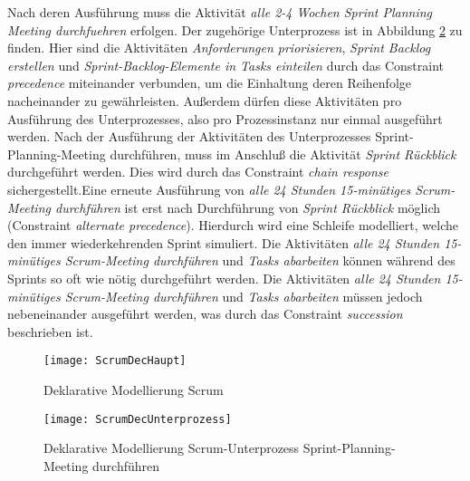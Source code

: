 Nach deren Ausführung muss die Aktivität \textit{alle 2-4 Wochen Sprint Planning Meeting durchfuehren} erfolgen. Der zugehörige Unterprozess ist in Abbildung \ref{fig:ScrumDecUnterprozess} zu finden. Hier sind die Aktivitäten \textit{Anforderungen priorisieren}, \textit{Sprint Backlog erstellen} und \textit{Sprint-Backlog-Elemente in Tasks einteilen} durch das Constraint \textit{precedence} miteinander verbunden, um die Einhaltung deren Reihenfolge nacheinander zu gewährleisten. Außerdem dürfen diese Aktivitäten pro Ausführung des Unterprozesses, also pro Prozessinstanz nur einmal ausgeführt werden.\newline
Nach der Ausführung der Aktivitäten des Unterprozesses Sprint-Planning-Meeting durchführen, muss im Anschluß die Aktivität \textit{Sprint Rückblick} durchgeführt werden. Dies wird durch das Constraint \textit{chain response} sichergestellt.Eine erneute Ausführung von  \textit{alle 24 Stunden 15-minütiges Scrum-Meeting durchführen} ist erst nach Durchführung von \textit{Sprint Rückblick} möglich (Constraint \textit{alternate precedence}). Hierdurch wird eine Schleife modelliert, welche den immer wiederkehrenden Sprint simuliert.\newline
Die Aktivitäten \textit{alle 24 Stunden 15-minütiges Scrum-Meeting durchführen} und \textit{Tasks abarbeiten} können während des Sprints so oft wie nötig durchgeführt werden. Die Aktivitäten  \textit{alle 24 Stunden 15-minütiges Scrum-Meeting durchführen} und \textit{Tasks abarbeiten} müssen jedoch nebeneinander ausgeführt werden, was durch das Constraint \textit{succession} beschrieben ist. \newline


\begin{figure}[htp]
\begin{center}
  \texttt{[image: ScrumDecHaupt]} %
  \caption{Deklarative Modellierung Scrum}
  \label{fig:ScrumDecHaupt}
\end{center}
\end{figure}



\begin{figure}[htp]
\begin{center}
  \texttt{[image: ScrumDecUnterprozess]} %
  \caption{Deklarative Modellierung Scrum-Unterprozess Sprint-Planning-Meeting durchführen}
  \label{fig:ScrumDecUnterprozess}
\end{center}
\end{figure}
\clearpage

